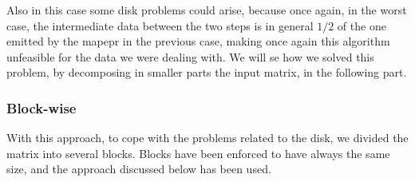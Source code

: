 Also in this case some disk problems could arise, because once again, in the worst case, the intermediate data between the two steps is in general $1/2$ of the one emitted by the mapepr in the previous case, making once again
this algorithm unfeasible for the data we were dealing with.
We will se how we solved this problem, by decomposing in smaller parts the input matrix, in the following part.

\subsubsection{Block-wise}
With this approach, to cope with the problems related to the disk, we divided the matrix into several blocks.
Blocks have been enforced to have always the same size, and the approach discussed below has been used.


